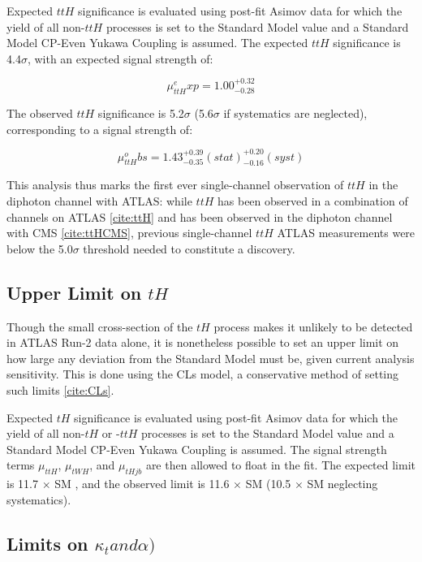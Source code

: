 Expected $ttH$ significance is evaluated using post-fit Asimov data for which the yield of all non-$ttH$ processes is set to the Standard Model value and a Standard Model CP-Even Yukawa Coupling is assumed. The expected $ttH$ significance is 4.4$\sigma$, with an expected signal strength of:
 
\begin{equation}
\mu_{ttH}^exp = 1.00^{+0.32}_{-0.28}
\end{equation}

The observed $ttH$ significance is 5.2$\sigma$ (5.6$\sigma$ if systematics are neglected), corresponding to a signal strength of:

\begin{equation}
\mu_{ttH}^obs = 1.43^{+0.39}_{-0.35}(stat)^{+0.20}_{-0.16}(syst)
\end{equation}
 

This analysis thus marks the first ever single-channel observation of $ttH$ in the diphoton channel with ATLAS: while $ttH$ has been observed in a combination of channels on ATLAS \ref{cite:ttH} and has been observed in the diphoton channel with CMS \ref{cite:ttHCMS}, previous single-channel $ttH$ ATLAS measurements were below the 5.0$\sigma$ threshold needed to constitute a discovery. 
 
\subsection{Upper Limit on $tH$}

Though the small cross-section of the $tH$ process makes it unlikely to be detected in ATLAS Run-2 data alone, it is nonetheless possible to set an upper limit on how large any deviation from the Standard Model must be, given current analysis sensitivity. This is done using the CLs model, a conservative method of setting such limits \ref{cite:CLs}.

Expected $tH$ significance is evaluated using post-fit Asimov data for which the yield of all non-$tH$ or -$ttH$ processes is set to the Standard Model value and a Standard Model CP-Even Yukawa Coupling is assumed. The signal strength terms $\mu_{ttH}$, $\mu_{tWH}$, and $\mu_{tHjb}$ are then allowed to float in the fit. The expected limit is 11.7 $\times$ SM , and the observed limit is 11.6 $\times$ SM (10.5 $\times$ SM neglecting systematics).

\subsection{Limits on $\kappa_{t} and \alpha)$}

